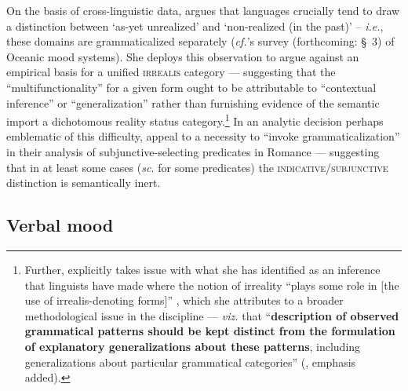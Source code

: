 On the basis of cross-linguistic data, \citet[138\textit{ff}]{Cristofaro2012} argues that languages crucially tend to draw a distinction between `as-yet unrealized' and `non-realized (in the past)' -- \textit{i.e.}, these domains are grammaticalized separately (\textit{cf.}\citet{VonPrincea}'s survey (forthcoming: \S~3) of Oceanic mood systems). She deploys this observation to argue against an empirical basis for a unified \textsc{irrealis} category --- suggesting that the ``multifunctionality'' for a given form ought to be attributable to ``contextual inference'' or ``generalization'' rather than furnishing evidence of the semantic import a dichotomous reality status category.\footnote{Further, \citeauthor{Cristofaro2012} explicitly takes issue with what she has identified as an inference that linguists have made where the notion of irreality ``plays some role in [the use of irrealis-denoting forms]'' \citeyearpar[132]{Cristofaro2012}, which she attributes to a broader methodological issue in the discipline --- \textit{viz.} that ``\textbf{description of observed grammatical patterns should be kept distinct from the formulation of explanatory generalizations about these patterns}, including generalizations about particular grammatical categories'' (\citeyear[145]{Cristofaro2012}, emphasis added).}  In an analytic decision perhaps emblematic of this difficulty, \citet[467]{Portner2012} appeal to a necessity to ``invoke  grammaticalization'' in their analysis of subjunctive-selecting predicates in Romance --- suggesting that in at least some cases (\textit{sc.} for some predicates) the \textsc{indicative/subjunctive} distinction is semantically inert.
	
	
\subsection{Verbal mood}\label{sec:mood-lit}

